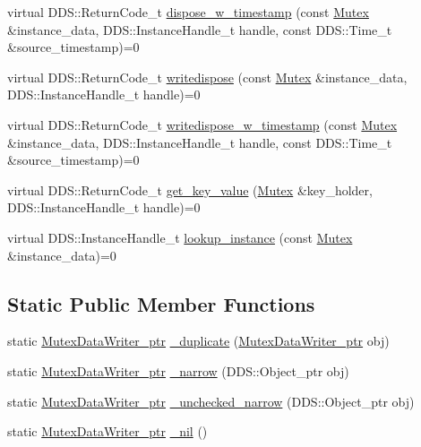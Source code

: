 \begin{DoxyCompactItemize}
\item 
virtual DDS::ReturnCode\_\-t \hyperlink{classKnowledge_1_1MutexDataWriter_a6b2ae2619ed3c9acb478bc1cb16ac3fd}{dispose\_\-w\_\-timestamp} (const \hyperlink{structKnowledge_1_1Mutex}{Mutex} \&instance\_\-data, DDS::InstanceHandle\_\-t handle, const DDS::Time\_\-t \&source\_\-timestamp)=0
\item 
virtual DDS::ReturnCode\_\-t \hyperlink{classKnowledge_1_1MutexDataWriter_a65cac8d7d8f8cf24410247cd16b96cc4}{writedispose} (const \hyperlink{structKnowledge_1_1Mutex}{Mutex} \&instance\_\-data, DDS::InstanceHandle\_\-t handle)=0
\item 
virtual DDS::ReturnCode\_\-t \hyperlink{classKnowledge_1_1MutexDataWriter_a42e1a1f013d1e6617774bd4d3da9a2dd}{writedispose\_\-w\_\-timestamp} (const \hyperlink{structKnowledge_1_1Mutex}{Mutex} \&instance\_\-data, DDS::InstanceHandle\_\-t handle, const DDS::Time\_\-t \&source\_\-timestamp)=0
\item 
virtual DDS::ReturnCode\_\-t \hyperlink{classKnowledge_1_1MutexDataWriter_a304c30d3e7e62d434aa2fea910a35d0a}{get\_\-key\_\-value} (\hyperlink{structKnowledge_1_1Mutex}{Mutex} \&key\_\-holder, DDS::InstanceHandle\_\-t handle)=0
\item 
virtual DDS::InstanceHandle\_\-t \hyperlink{classKnowledge_1_1MutexDataWriter_ae60b5b5ce9cf97ff730fb632cf9a6bab}{lookup\_\-instance} (const \hyperlink{structKnowledge_1_1Mutex}{Mutex} \&instance\_\-data)=0
\end{DoxyCompactItemize}
\subsection*{Static Public Member Functions}
\begin{DoxyCompactItemize}
\item 
static \hyperlink{classKnowledge_1_1MutexDataWriter}{MutexDataWriter\_\-ptr} \hyperlink{classKnowledge_1_1MutexDataWriter_ae3593f0350ec7e2c3d58a9a40eb6169f}{\_\-duplicate} (\hyperlink{classKnowledge_1_1MutexDataWriter}{MutexDataWriter\_\-ptr} obj)
\item 
static \hyperlink{classKnowledge_1_1MutexDataWriter}{MutexDataWriter\_\-ptr} \hyperlink{classKnowledge_1_1MutexDataWriter_add05fa3f246338a80646cb11baf7725d}{\_\-narrow} (DDS::Object\_\-ptr obj)
\item 
static \hyperlink{classKnowledge_1_1MutexDataWriter}{MutexDataWriter\_\-ptr} \hyperlink{classKnowledge_1_1MutexDataWriter_a012037ba81aa1415cb853fdfb4cb58f4}{\_\-unchecked\_\-narrow} (DDS::Object\_\-ptr obj)
\item 
static \hyperlink{classKnowledge_1_1MutexDataWriter}{MutexDataWriter\_\-ptr} \hyperlink{classKnowledge_1_1MutexDataWriter_a5b045618b232b087bd9288be1c0d1e17}{\_\-nil} ()
\end{DoxyCompactItemize}
